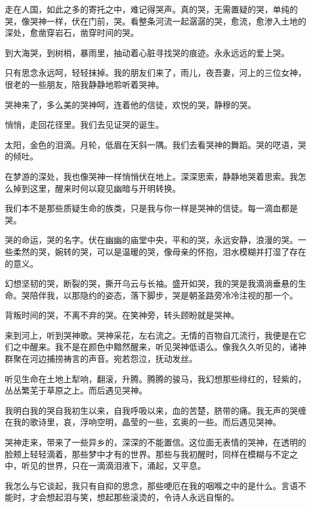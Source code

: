 \documentclass[UTF8]{article}
\begin{document}
\par 走在人国，如此之多的寄托之中，难记得哭声。真的哭，无需置疑的哭，单纯的哭，像哭神一样，伏在门前，哭。看整条河流一起潺潺的哭，愈流，愈渗入土地的深处，愈凿穿岩石，凿穿时间的哭。
\par 到大海哭，到树梢，暴雨里，抽动着心脏寻找哭的痕迹。永永远远的爱上哭。
\par 只有思念永远呵，轻轻抹掉。我的朋友们来了，雨儿，夜吾妻，河上的三位女神，很老的一些朋友，陪我静静地聆听着哭神。
\par 哭神来了，多么美的哭神呵，连着他的信徒，欢悦的哭，静穆的哭。
\\[0.6cm]
\par 悄悄，走回花径里。我们去见证哭的诞生。
\par 太阳，金色的泪滴。月轮，低眉在天斜一隅。我们去看哭神的舞蹈。哭的呓语，哭的倾吐。
\par 在梦游的深处，我也像哭神一样悄悄伏在地上。深深思索，静静地哭着思索。我怎么掉到这里，醒来时何以窥见幽暗与开明转换。
\par 我们本不是那些质疑生命的族类，只是我与你一样是哭神的信徒。每一滴血都是哭。
\par 哭的命运，哭的名字。伏在幽幽的庙堂中央，平和的哭，永远安静，浪漫的哭。一些柔然的哭，婉转的哭，可以是温暖的哭，像母亲的怀抱，泪水模糊并打湿了存在的意义。
\par 幻想坚韧的哭，断裂的哭，撕开乌云与长袖。盛开如哭，我的哭是我滴淌垂悬的生命。哭陪伴我，以那隐约的姿态，落下脚步，哭是朝圣路旁冷冷注视的那一个。
\par 背叛时间的哭，不离不弃的哭。在笑神旁，转头顾盼就是哭神。
\par 来到河上，听到哭神歌。哭神采花，左右流之。无情的百物自兀流行，我便是在它们之中醒来。我不是在颜色中黯然醒来，听见哭神低语么。像我久久听见的，诸神群聚在河边捕捞祷言的声音。宛若怨泣，抚动发丝。
\par 听见生命在土地上犁响，翻滚，升腾。腾腾的骏马，我幻想那些绯红的，轻紫的，丛丛繁芜于草原之上。而后遇见哭神。
\par 我明白我的哭自我初生以来，自我呼吸以来，血的苦楚，脐带的痛。我无声的哭缠在我的歌诗里，哀，浮响空明，晶莹的一些，玄奥的一些。而后遇见哭神。
\par 哭神走来，带来了一些异乡的，深深的不能置信。这位面无表情的哭神，在透明的脸颊上轻轻滴着，那些梦中才有的世界。那些与我初醒时，同样在模糊与不定之中，听见的世界，只在一滴滴泪液下，涌起，又平息。
\par 我怎么与它谈起，我只有自抑的思念，那些哽厄在我的咽喉之中的是什么。言语不能时，才会想起泪与笑，想起那些滚烫的，令诗人永远自惭的。
\end{document}
